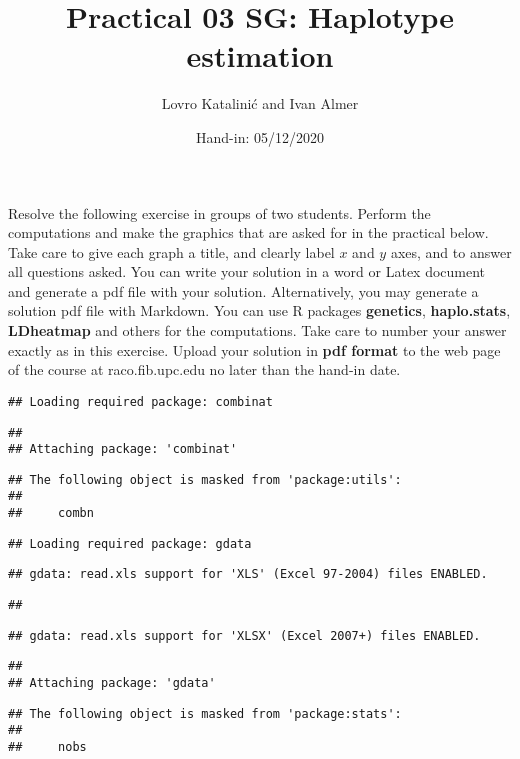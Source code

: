 \documentclass[
]{article}
\title{Practical 03 SG: Haplotype estimation}
\author{Lovro Katalinić and Ivan Almer}
\date{Hand-in: 05/12/2020}
\begin{document}
\maketitle

Resolve the following exercise in groups of two students. Perform the
computations and make the graphics that are asked for in the practical
below. Take care to give each graph a title, and clearly label \(x\) and
\(y\) axes, and to answer all questions asked. You can write your
solution in a word or Latex document and generate a pdf file with your
solution. Alternatively, you may generate a solution pdf file with
Markdown. You can use R packages \textbf{genetics},
\textbf{haplo.stats}, \textbf{LDheatmap} and others for the
computations. Take care to number your answer exactly as in this
exercise. Upload your solution in \textbf{pdf format} to the web page of
the course at raco.fib.upc.edu no later than the hand-in date.

\begin{verbatim}
## Loading required package: combinat
\end{verbatim}

\begin{verbatim}
## 
## Attaching package: 'combinat'
\end{verbatim}

\begin{verbatim}
## The following object is masked from 'package:utils':
## 
##     combn
\end{verbatim}

\begin{verbatim}
## Loading required package: gdata
\end{verbatim}

\begin{verbatim}
## gdata: read.xls support for 'XLS' (Excel 97-2004) files ENABLED.
\end{verbatim}

\begin{verbatim}
## 
\end{verbatim}

\begin{verbatim}
## gdata: read.xls support for 'XLSX' (Excel 2007+) files ENABLED.
\end{verbatim}

\begin{verbatim}
## 
## Attaching package: 'gdata'
\end{verbatim}

\begin{verbatim}
## The following object is masked from 'package:stats':
## 
##     nobs
\end{verbatim}
\end{document}
